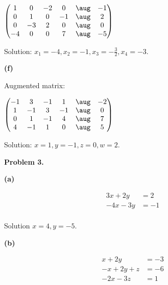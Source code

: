 \documentclass[oneside,12pt]{amsart}
\begin{document}
\bigskip

$
\begin{pmatrix}
   1  &  0   & -2  &  0 & \aug  & -1  \\
   0  &  1   &  0  & -1 & \aug  & 2   \\
   0  & -3   &  2  &  0 & \aug  & 0   \\
  -4   & 0   &  0  &  7 & \aug  & -5  \\
\end{pmatrix}
$

\bigskip

Solution: $x_1=-4, x_2=-1, x_3 = -\frac{3}{2}, x_4=-3$.


\bigskip

\textbf{(f)}

Augmented matrix:

\bigskip

$
\begin{pmatrix}
  -1  &  3   & -1  &  1 & \aug  & -2  \\
   1  & -1   &  3  & -1 & \aug  &  0  \\
   0  &  1   & -1  &  4 & \aug  &  7  \\
   4  & -1   &  1  &  0 & \aug  &  5  \\
\end{pmatrix}
$

\bigskip

Solution: $x=1, y=-1, z=0, w=2$.

\bigskip

\textbf{Problem 3.}

\bigskip


\textbf{(a)}

\begin{align*}
3x + 2y   &= 2 \\
-4x -3y &= -1 \\
\end{align*}

Solution $x=4, y=-5$.

\bigskip


\textbf{(b)}

\begin{align*}
  x + 2y       &= -3 \\
 -x + 2y +  z  &= -6 \\
-2x     - 3z  &=  1 \\
\end{align*}
\end{document}
